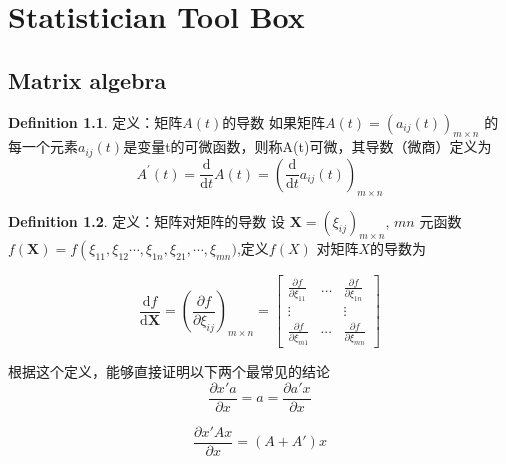 \documentclass[
]{book}
\theoremstyle{definition}
\newtheorem{definition}{Definition}[chapter]
\theoremstyle{definition}
\theoremstyle{definition}
\theoremstyle{remark}
\begin{document}
\hypertarget{statistician-tool-box}{%
\chapter{Statistician Tool Box}\label{statistician-tool-box}}

\hypertarget{matrix}{%
\section{Matrix algebra}\label{matrix}}

\begin{definition}
\protect\hypertarget{def:unnamed-chunk-2}{}{\label{def:unnamed-chunk-2} }定义：矩阵\(A(t)\)的导数
如果矩阵\(A(t)=\left(a_{i j}(t)\right)_{m \times n}\) 的每一个元素\(a_{ij}(t)\)是变量t的可微函数，则称A(t)可微，其导数（微商）定义为
\[
A^{\prime}(t)=\frac{\mathrm{d}}{\mathrm{d} t} A(t)=\left(\frac{\mathrm{d}}{\mathrm{d} t} a_{i j}(t)\right)_{m \times n}
\]
\end{definition}

\begin{definition}
\protect\hypertarget{def:unnamed-chunk-3}{}{\label{def:unnamed-chunk-3} }定义：矩阵对矩阵的导数
设 \(\boldsymbol{X}=\left(\xi_{i j}\right)_{m \times n}\), \(mn\) 元函数 \(f(\boldsymbol{X})=f\left(\xi_{11}, \xi_{12}\cdots, \xi_{1 n}, \xi_{21}, \cdots, \xi_{m n} )\right.\),定义\(f(X)\) 对矩阵\(X\)的导数为

\begin{equation}
\frac{\mathrm{d} f}{\mathrm{d} \boldsymbol{X}}=\left(\frac{\partial f}{\partial \xi_{i j}}\right)_{m \times n}=
\left[
 \begin{array}{ccc}
{\frac{\partial f}{\partial \xi_{11}}} 
& {\dots} & {\frac{\partial f}{\partial \xi_{1 n}}}
 \\ {\vdots} & { } & {\vdots} \\ 
{\frac{\partial f}{\partial \xi_{m 1}}} & {\cdots} & {\frac{\partial f}{\partial \xi_{m n}}}

\end{array}\right]
\end{equation}
\end{definition}
根据这个定义，能够直接证明以下两个最常见的结论
\[
\frac{\partial x'a}{\partial x}=a=\frac{\partial a'x}{\partial x}
\]

\[
\frac{\partial x'Ax}{\partial x}=(A+A')x
\]
\end{document}
